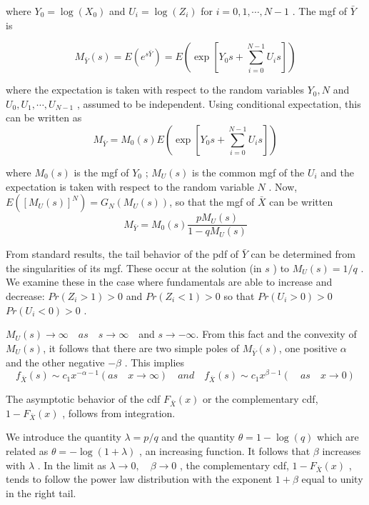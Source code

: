 \documentclass[10pt,a4paper]{article}
\begin{document}
where $Y_{0}= \log (X_{0}) $ and $U_{i}=\log (Z_{i})$   for $i=0,1,\cdots, N-1$ . The mgf of  $\bar{Y}$ is
 
\begin{equation}
M_{\bar{Y}}(s)=E(e^{s\bar{Y}})=E(\exp [Y_{0}s+\sum^{N-1}_{i=0}U_{i}s])   \tag{C.5}
\end{equation}

where the expectation is taken with respect to the random variables $Y_{0}, N$  and $U_{0},U_{1}, \cdots, U_{N-1}$ , assumed to be independent. Using conditional expectation, this can be written as
\begin{equation}
M_{\bar{Y}}=M_{0}(s) E(\exp [Y_{0}s+\sum^{N-1}_{i=0}U_{i}s])   \tag{C.6}
\end{equation}

where $M_{0}(s)$   is the mgf of $Y_{0}$ ;  $M_{U}(s)$ is the common mgf of the $U_{i}$   and the expectation is taken with respect to the random variable $N$ . Now,$E([M_{U}(s)]^{N})=G_{N}(M_{U}(s))  $, so that the mgf of $\bar{X}$   can be written 
\begin{equation}
M_{\bar{Y}}=M_{0}(s)\frac{pM_{U}(s)}{1-qM_{U}(s)}   \tag{C.7}
\end{equation}

From standard results, the tail behavior of the pdf of $\bar{Y}$  can be determined from the singularities of its mgf. These occur at the solution (in $s$ ) to $M_{U}(s)=1/q$  . We examine these in the case where
fundamentals are able to increase and decrease:  $Pr(Z_{i}>1)>0$ and $Pr(Z_{i}<1)>0$  so that   $Pr(U_{i}>0)>0$    $Pr(U_{i}<0)>0 $ .

$M_{U}(s) \to \infty \quad  as \quad  s \to \infty$　and $s \to -\infty $. 
From this fact and the convexity of  $M_{U}(s)$, it follows that there are two simple poles of  $M_{\bar{Y}}(s)$, one positive  $\alpha$  and the other negative $-\beta$ . This implies
\begin{equation}
f_{\bar{X}}(s) \sim c_{1}x^{-\alpha-1} (as \quad  x \to \infty)  \quad and \quad   f_{\bar{X}}(s) \sim  \tag{C.8} c_{1}x^{\beta-1} (\quad as \quad  x \to 0)
\end{equation}

The asymptotic behavior of the cdf  $F_{\bar{X}}(x)$  or the complementary cdf, $1-F_{\bar{X}}(x)$ , follows from integration. 

We introduce the quantity $\lambda=p/q$  and the quantity $\theta=1-\log (q)$  which are related as $\theta=-\log (1+\lambda)$  , an increasing function. It follows that $\beta$  increases with $\lambda$  . In the limit as $\lambda \to 0, \quad \beta \to 0$ , the complementary cdf, $1-F_{\bar{X}}(x)$  , tends to follow the power law distribution with the exponent  $1+\beta$ equal to unity in the right tail. 
\end{document}
